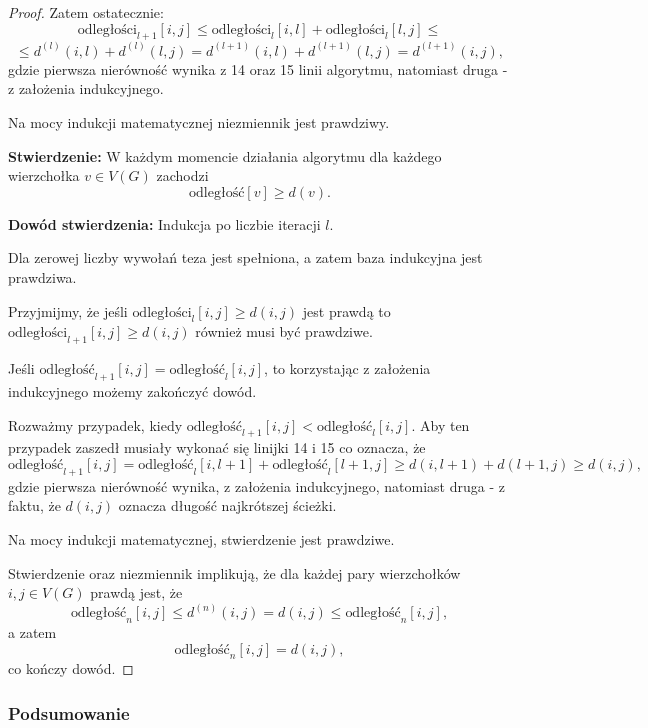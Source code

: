 \begin{theorem}
\begin{proof}
		Zatem ostatecznie:
		\[\text{odległości}_{l+1}[i,j] \leq 
		\text{odległości}_{l}[i,l] + \text{odległości}_{l}[l,j] \leq
		\]
		\[\leq d^{(l)}(i, l) + d^{(l)}(l, j) = d^{(l+1)}(i, l) + d^{(l+1)}(l, j) = d^{(l+1)}(i, j),\]
		gdzie pierwsza nierówność wynika z 14 oraz 15 linii algorytmu,
		natomiast druga - z założenia indukcyjnego.
		
		Na mocy indukcji matematycznej niezmiennik jest prawdziwy.
		
		\textbf{Stwierdzenie:} W każdym momencie działania algorytmu
		dla każdego wierzchołka $v \in V(G)$ zachodzi 
		\[\text{odległość}[v] \geq d(v).\]
		
		\textbf{Dowód stwierdzenia:} Indukcja po liczbie iteracji $l$.
		
		Dla zerowej liczby wywołań teza jest spełniona, a 
		zatem baza indukcyjna jest prawdziwa.
		
		Przyjmijmy, że jeśli $\text{odległości}_l[i, j] \geq d(i, j)$
		jest prawdą to $\text{odległości}_{l+1}[i, j] \geq d(i, j)$
		również musi być prawdziwe.
		
		Jeśli $\text{odległość}_{l+1}[i, j] = \text{odległość}_{l}[i, j]$,
		to korzystając z założenia indukcyjnego możemy zakończyć dowód.
		
		Rozważmy przypadek, kiedy 
		$\text{odległość}_{l+1}[i, j] < \text{odległość}_{l}[i, j]$. 
		Aby ten przypadek zaszedł musiały wykonać się linijki 14 i 15
		co oznacza, że 
		\[\text{odległość}_{l+1}[i, j] = \text{odległość}_{l}[i, l+1] 
		+ \text{odległość}_{l}[l+1, j] \geq d(i, l+1) + d(l+1, j)
		\geq d(i, j),\]
		gdzie pierwsza nierówność wynika, z założenia indukcyjnego,
		natomiast druga - z faktu, że $d(i, j)$ oznacza
		długość najkrótszej ścieżki.
		
		Na mocy indukcji matematycznej, stwierdzenie jest prawdziwe.
		
		Stwierdzenie oraz niezmiennik implikują, że 
		dla każdej pary wierzchołków
		$i, j \in V(G)$ prawdą jest, że 
		\[\text{odległość}_n[i,j] \leq d^{(n)}(i, j) = d(i, j) \leq \text{odległość}_n[i,j],\]
		a zatem
		\[\text{odległość}_n[i,j] = d(i, j),\]
		co kończy dowód.
		
	\end{proof} 
	\label{floydWarshall_proof}
\end{theorem}

\subsubsection{Podsumowanie}